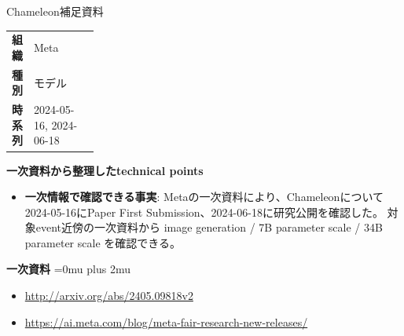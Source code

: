 \Needspace{0.38\textheight}
\begin{technicalnote}{Chameleon}{補足資料}
\begingroup
\begin{tabularx}{\linewidth}{@{}>{\bfseries}p{0.22\linewidth}X@{}}
組織 & Meta \\
種別 & モデル \\
時系列 & 2024-05-16, 2024-06-18 \\
\end{tabularx}
\smallskip
\begin{minipage}{\linewidth}
{\bfseries 一次資料から整理したtechnical points}
\begin{itemize}[leftmargin=1.5em,itemsep=0.35em]
\item \textbf{一次情報で確認できる事実}: Metaの一次資料により、Chameleonについて2024-05-16にPaper First Submission、2024-06-18に研究公開を確認した。 対象event近傍の一次資料から image generation / 7B parameter scale / 34B parameter scale を確認できる。
\end{itemize}
\begin{minipage}{\linewidth}
\begin{samepage}
{\bfseries 一次資料}
\begingroup\sloppy
\Urlmuskip=0mu plus 2mu\relax
\begin{itemize}[leftmargin=1.5em,itemsep=0.25em]
\item {\scriptsize\url{http://arxiv.org/abs/2405.09818v2}}
\item {\scriptsize\url{https://ai.meta.com/blog/meta-fair-research-new-releases/}}
\end{itemize}
\endgroup
\end{samepage}
\end{minipage}
\end{minipage}
\endgroup
\end{technicalnote}
\medskip

